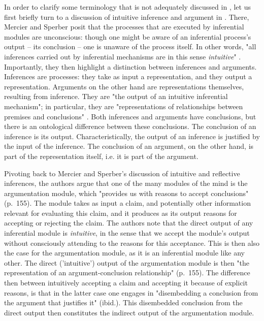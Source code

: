 In order to clarify some terminology that is not adequately discussed in \citet{MS09}, let us first briefly turn to a discussion of intuitive inference and argument in \citet[\S 1.1]{MS11}.
There, Mercier and Sperber posit that the processes that are executed by inferential modules are unconscious: though one might be aware of an inferential process's output -- its conclusion -- one is unaware of the process itself. In other words, "all inferences carried out by inferential mechanisms are in this sense \emph{intuitive}" \citep[p.~58]{MS11}.
Importantly, they then highlight a distinction between inferences and arguments.
Inferences are processes: they take as input a representation, and they output a representation.
Arguments on the other hand are representations themselves, resulting from inference. They are "the output of an intuitive inferential mechanism"; in particular, they are "representations of relationships between premises and conclusions" \citep[p.~58]{MS11}.
Both inferences and arguments have conclusions, but there is an ontological difference between these conclusions.
The conclusion of an inference is its output. Characteristically, the output of an inference is justified by the input of the inference.
The conclusion of an argument, on the other hand, is part of the representation itself, i.e. it is part of the argument.

Pivoting back to Mercier and Sperber's \citeyear{MS09} discussion of intuitive and reflective inferences,
the authors argue that one of the many modules of the mind is the argumentation module, which "provides us with reasons to accept conclusions" (p.~155). The module takes as input a claim, and potentially other information relevant for evaluating this claim, and it produces as its output reasons for accepting or rejecting the claim.
The authors note that the direct output of any inferential module is \emph{intuitive}, in the sense that we accept the module's output without consciously attending to the reasons for this acceptance. This is then also the case for the argumentation module, as it is an inferential module like any other. The direct ('intuitive') output of the argumentation module is then "the representation of an argument-conclusion relationship" (p.~155).
The difference then between intuitively accepting a claim and accepting it because of explicit reasons, is that in the latter case one engages in "disembedding a conclusion from the argument that justifies it" (ibid.).
This disembedded conclusion from the direct output then constitutes the indirect output of the argumentation module.

